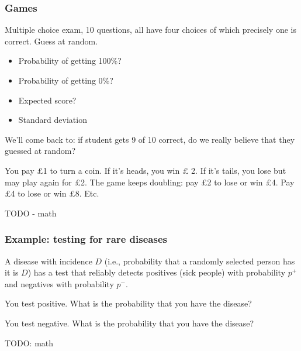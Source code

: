 \documentclass[t]{beamer}
\begin{document}
\begin{frame}
  \frametitle{Games}

   {
    Multiple choice exam, 10 questions, all have four choices of which
    precisely one is correct.  Guess at random.
    \begin{itemize}
    \item Probability of getting 100\%? 
    \item Probability of getting 0\%? 
    \item Expected score? 
    \item Standard deviation 
    \end{itemize}
    We'll come back to: if student gets 9 of 10 correct, do we really
    believe that they guessed at random?
  }


   {
    You pay \pounds 1 to turn a coin.  If it's heads, you win \pounds
    2.  If it's tails, you lose but may play again for \pounds 2.  The
    game keeps doubling: pay \pounds 2 to lose or win \pounds 4.  Pay
    \pounds 4 to lose or win \pounds 8.  Etc.

    TODO - math
  }

\end{frame}

\begin{frame}
  \frametitle{Example: testing for rare diseases}

  A disease with incidence $D$ (i.e., probability that a randomly
  selected person has it is $D$) has a test that reliably detects
  positives (sick people) with probability $p^+$ and negatives with
  probability $p^-$.

  You test positive.  What is the probability that you have the disease?

  You test negative.  What is the probability that you have the
  disease?

  TODO: math
\end{frame}
\end{document}
